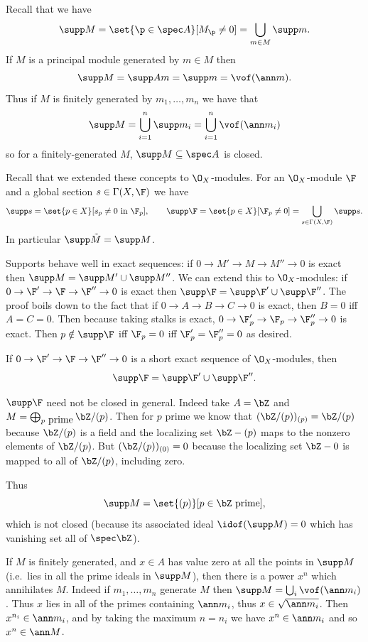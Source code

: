 Recall that we have
$$ \supp M = \set{\p\in\spec A}[M_\p\neq0] = \bigcup_{m\in M}\supp m . $$
If $M$ is a principal module generated by $m\in M$ then
$$ \supp M = \supp Am = \supp m = \vof(\ann m) . $$
Thus if $M$ is finitely generated by $m_1,\dots,m_n$ we have that
$$ \supp M = \bigcup_{i=1}^n\supp m_i = \bigcup_{i=1}^n\vof(\ann m_i) $$
so for a finitely-generated $M$, $\supp M\subseteq\spec A$ is closed.

Recall that we extended these concepts to $\O_X$-modules.
For an $\O_X$-module $\F$ and a global section $s\in\Gamma(X,\F)$ we have
$$ \supp s = \set{p\in X}[s_p\neq0\hbox{ in $\F_p$}],\qquad \supp\F = \set{p\in X}[\F_p\neq0] = \bigcup_{s\in\Gamma(X,\F)}\supp s . $$
In particular $\supp\tilde M=\supp M$.

Supports behave well in exact sequences: if $0\to M'\to M\to M''\to0$ is exact then $\supp M=\supp M'\cup\supp M''$.
We can extend this to $\O_X$-modules: if $0\to\F'\to\F\to\F''\to0$ is exact then $\supp\F=\supp\F'\cup\supp\F''$.
The proof boils down to the fact that if $0\to A\to B\to C\to0$ is exact, then $B=0$ iff $A=C=0$.
Then because taking stalks is exact, $0\to\F'_p\to\F_p\to\F''_p\to0$ is exact.
Then $p\notin\supp\F$ iff $\F_p=0$ iff $\F'_p=\F''_p=0$ as desired.

\bprop[name={suppses}]

    If $0\to\F'\to\F\to\F''\to0$ is a short exact sequence of $\O_X$-modules, then
    $$ \supp\F = \supp\F'\cup\supp\F'' . $$

\eprop

\bexam

    $\supp\F$ need not be closed in general.
    Indeed take $A=\bZ$ and $M=\bigoplus_{p\hbox{ prime}}\bZ/(p)$.
    Then for $p$ prime we know that $(\bZ/(p))_{(p)}=\bZ/(p)$ because $\bZ/(p)$ is a field and the localizing set $\bZ-(p)$ maps to the nonzero elements of $\bZ/(p)$.
    But $(\bZ/(p))_{(0)}=0$ because the localizing set $\bZ-0$ is mapped to all of $\bZ/(p)$, including zero.

    Thus
    $$ \supp M = \set{(p)}[p\in\bZ\hbox{ prime}] , $$
    which is not closed (because its associated ideal $\idof(\supp M)=0$ which has vanishing set all of $\spec\bZ$).

\eexam

If $M$ is finitely generated, and $x\in A$ has value zero at all the points in $\supp M$ (i.e.\ lies in all the prime ideals in $\supp M$), then there is a power $x^n$ which
annihilates $M$.
Indeed if $m_1,\dots,m_n$ generate $M$ then $\supp M=\bigcup_i\vof(\ann m_i)$.
Thus $x$ lies in all of the primes containing $\ann m_i$, thus $x\in\sqrt{\ann m_i}$.
Then $x^{n_i}\in\ann m_i$, and by taking the maximum $n=n_i$ we have $x^n\in\ann m_i$ and so $x^n\in\ann M$.

